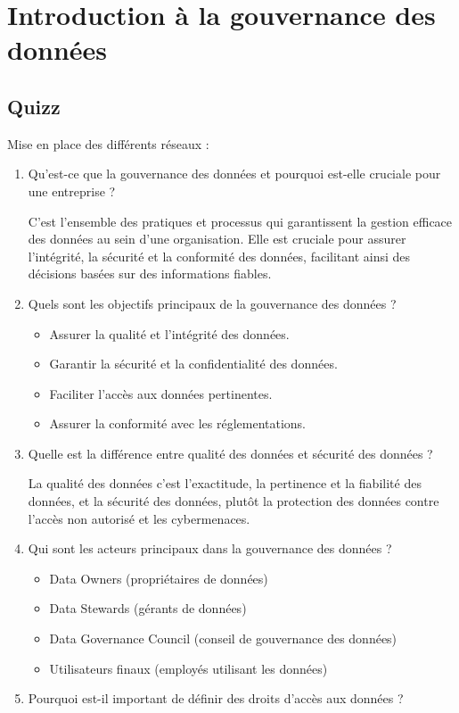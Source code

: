 \chapter{Introduction à la gouvernance des données}

\section*{Quizz}
Mise en place des différents réseaux :

\begin{enumerate}
    \item Qu'est-ce que la gouvernance des données et pourquoi est-elle cruciale pour une entreprise ?

        C'est l'ensemble des pratiques et processus qui garantissent la gestion efficace des données au sein d'une organisation. Elle est cruciale pour assurer l'intégrité, la sécurité et la conformité des données, facilitant ainsi des décisions basées sur des informations fiables.
    \item Quels sont les objectifs principaux de la gouvernance des données ?

        \begin{itemize}
            \item Assurer la qualité et l'intégrité des données.
            \item Garantir la sécurité et la confidentialité des données.
            \item Faciliter l'accès aux données pertinentes.
            \item Assurer la conformité avec les réglementations.
        \end{itemize}
    \item Quelle est la différence entre qualité des données et sécurité des données ?

        La qualité des données c'est l'exactitude, la pertinence et la fiabilité des données, et la sécurité des données, plutôt la protection des données contre l'accès non autorisé et les cybermenaces.
    \item Qui sont les acteurs principaux dans la gouvernance des données ?

        \begin{itemize}
            \item Data Owners (propriétaires de données)
            \item Data Stewards (gérants de données)
            \item Data Governance Council (conseil de gouvernance des données)
            \item Utilisateurs finaux (employés utilisant les données)
        \end{itemize}
    \item Pourquoi est-il important de définir des droits d'accès aux données ?


\end{enumerate}
